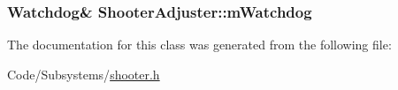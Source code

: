 \hypertarget{class_shooter_adjuster_a8d4e4deae719e94880c7828f8baed77c}{
\subsubsection[{m\-Watchdog}]{\setlength{\rightskip}{0pt plus 5cm}\-Watchdog\& {\bf \-Shooter\-Adjuster\-::m\-Watchdog}}}\label{class_shooter_adjuster_a8d4e4deae719e94880c7828f8baed77c}


\-The documentation for this class was generated from the following file\-:\begin{DoxyCompactItemize}
\item 
\-Code/\-Subsystems/\hyperlink{shooter_8h}{shooter.\-h}\end{DoxyCompactItemize}
